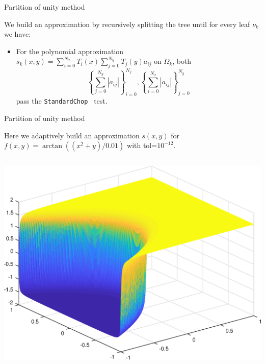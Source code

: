 \documentclass{beamer}
\newcommand{\lp}{\left(}
\newcommand{\rp}{\right)}
\begin{document}
\begin{frame}{Partition of unity method}
\begin{center}
We build an approximation by recursively splitting the tree until for every leaf $\nu_k$ we have:
\end{center}
\begin{itemize}
\item For the polynomial approximation $s_k(x,y)=\sum_{i=0}^{N_x} T_i(x) \sum_{j=0}^{N_y} T_j(y)a_{ij}$ on $\Omega_k$, both $$ \left \{ \sum_{j=0}^{N_y} |a_{ij}|  \right \}_{i=0}^{N_x}, \left \{ \sum_{i=0}^{N_x} |a_{ij}|  \right \}_{j=0}^{N_y} $$ pass the { \tt StandardChop } test.
\end{itemize}

\end{frame}

\begin{frame}{Partition of unity method}

\begin{center}
Here we adaptively build an approximation $s(x,y)$ for $f(x,y) = \arctan \lp \lp x^2+y \rp/0.01 \rp$ with tol=$10^{-12}$.
\end{center}

\begin{columns}[t]

\begin{column}{0.5\textwidth}	
\begin{center}
\includegraphics[scale = 0.3]{tan2Dplot.eps}	
\end{center}
\end{column}


\end{columns}
\end{frame}
\end{document}
